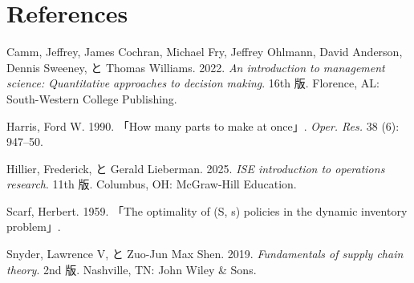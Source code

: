 \documentclass[
  japanese,
  letterpaper,
]{ltjbook}
\newlength{\cslhangindent}
\newenvironment{CSLReferences}[2] %
 {\begin{list}{}{%
  \setlength{\itemindent}{0pt}
  \setlength{\leftmargin}{0pt}
  \setlength{\parsep}{0pt}
  \ifodd #1
   \setlength{\leftmargin}{\cslhangindent}
   \setlength{\itemindent}{-1\cslhangindent}
  \fi
  \setlength{\itemsep}{#2\baselineskip}}}
 {\end{list}}
\theoremstyle{plain}
\theoremstyle{definition}
\theoremstyle{remark}
\begin{document}

\chapter*{References}\label{references}


\label{refs}
\begin{CSLReferences}{1}{0}
Camm, Jeffrey, James Cochran, Michael Fry, Jeffrey Ohlmann, David
Anderson, Dennis Sweeney, と Thomas Williams. 2022. \emph{An
introduction to management science: Quantitative approaches to decision
making}. 16th 版. Florence, AL: South-Western College Publishing.

Harris, Ford W. 1990. {「How many parts to make at once」}. \emph{Oper.
Res.} 38 (6): 947--50.

Hillier, Frederick, と Gerald Lieberman. 2025. \emph{{ISE} introduction
to operations research}. 11th 版. Columbus, OH: McGraw-Hill Education.

Scarf, Herbert. 1959. {「The optimality of ({S}, s) policies in the
dynamic inventory problem」}.

Snyder, Lawrence V, と Zuo-Jun Max Shen. 2019. \emph{Fundamentals of
supply chain theory}. 2nd 版. Nashville, TN: John Wiley \& Sons.

\end{CSLReferences}
\end{document}
